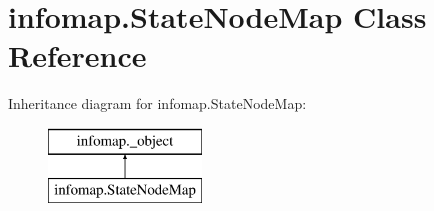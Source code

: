 \hypertarget{classinfomap_1_1StateNodeMap}{}\section{infomap.\+State\+Node\+Map Class Reference}
\label{classinfomap_1_1StateNodeMap}
Inheritance diagram for infomap.\+State\+Node\+Map\+:\begin{figure}[H]
\begin{center}
\leavevmode
\includegraphics[height=2.000000cm]{classinfomap_1_1StateNodeMap}
\end{center}
\end{figure}
